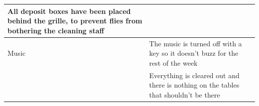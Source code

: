 \documentclass[a4paper,10pt,oneside,article]{memoir}
\begin{document}
\begin{tabular}{|l|l|}
\begin{minipage}[t]{0.80\textwidth}
        All deposit boxes have been placed behind the grille, to prevent flies from bothering the cleaning staff
    \end{minipage} \\
    \hline
    \begin{minipage}[t]{0.15\textwidth}
        Music
    \end{minipage} & 
    \begin{minipage}[t]{0.80\textwidth}
        The music is turned off with a key so it doesn't buzz for the rest of the week
    \end{minipage} \\
    \hline
    \begin{minipage}[t]{0.15\textwidth}
        
    \end{minipage} & 
    \begin{minipage}[t]{0.80\textwidth}
        Everything is cleared out and there is nothing on the tables that shouldn't be there
    \end{minipage} \\
    \hline
\end{tabular}
\end{document}

